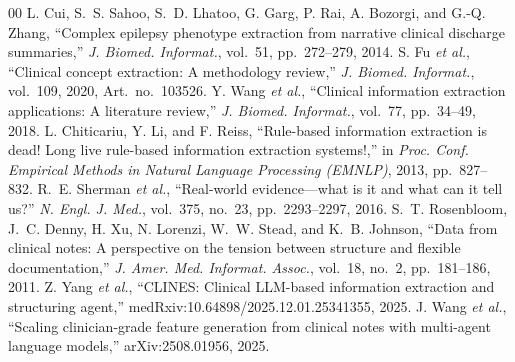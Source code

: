 \documentclass[conference]{IEEEtran}
\begin{document}
\begin{thebibliography}{00}
 L. Cui, S.~S. Sahoo, S.~D. Lhatoo, G. Garg, P. Rai, A. Bozorgi, and G.-Q. Zhang, ``Complex epilepsy phenotype extraction from narrative clinical discharge summaries,'' \emph{J. Biomed. Informat.}, vol.~51, pp.~272--279, 2014.
 S. Fu \emph{et al.}, ``Clinical concept extraction: A methodology review,'' \emph{J. Biomed. Informat.}, vol.~109, 2020, Art.~no.~103526.
 Y. Wang \emph{et al.}, ``Clinical information extraction applications: A literature review,'' \emph{J. Biomed. Informat.}, vol.~77, pp.~34--49, 2018.
 L. Chiticariu, Y. Li, and F. Reiss, ``Rule-based information extraction is dead! Long live rule-based information extraction systems!,'' in \emph{Proc. Conf. Empirical Methods in Natural Language Processing (EMNLP)}, 2013, pp.~827--832.
 R.~E. Sherman \emph{et al.}, ``Real-world evidence---what is it and what can it tell us?'' \emph{N. Engl. J. Med.}, vol.~375, no.~23, pp.~2293--2297, 2016.
 S.~T. Rosenbloom, J.~C. Denny, H. Xu, N. Lorenzi, W.~W. Stead, and K.~B. Johnson, ``Data from clinical notes: A perspective on the tension between structure and flexible documentation,'' \emph{J. Amer. Med. Informat. Assoc.}, vol.~18, no.~2, pp.~181--186, 2011.
 Z. Yang \emph{et al.}, ``CLINES: Clinical LLM-based information extraction and structuring agent,'' medRxiv:10.64898/2025.12.01.25341355, 2025.
 J. Wang \emph{et al.}, ``Scaling clinician-grade feature generation from clinical notes with multi-agent language models,'' arXiv:2508.01956, 2025.

\end{thebibliography}

\vspace{12pt}
\end{document}
